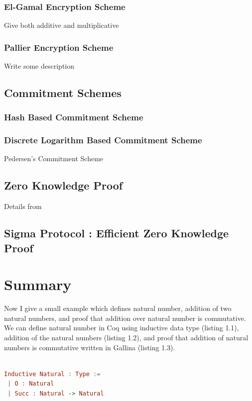      \subsubsection{El-Gamal Encryption Scheme}
        Give both additive and multiplicative
     \subsubsection{Pallier Encryption Scheme}
        Write some description
     \subsection{Commitment Schemes}   
        \subsubsection{Hash Based Commitment Scheme}
        \subsubsection{Discrete Logarithm Based Commitment Scheme}
         Pedersen's Commitment Scheme
     \subsection{Zero Knowledge Proof}
  		Details from 
  	 \subsection{Sigma Protocol : Efficient Zero Knowledge Proof}
  



\section{Summary}











Now I give a small example which defines natural number, addition of two natural numbers, and 
proof that addition over natural number is commutative.   We can define 
natural number in Coq using inductive data type (listing 1.1), addition of the natural numbers 
(listing 1.2), and proof that addition of natural numbers is commutative written in Gallina (listing 1.3).

\begin{lstlisting}[language=haskell, numbers=none, basicstyle=\ttfamily, 
caption=Inductive Data Type for Natural Numbers,  captionpos=b, xleftmargin=.1\textwidth]

Inductive Natural : Type :=
 | O : Natural
 | Succ : Natural -> Natural

\end{lstlisting}

